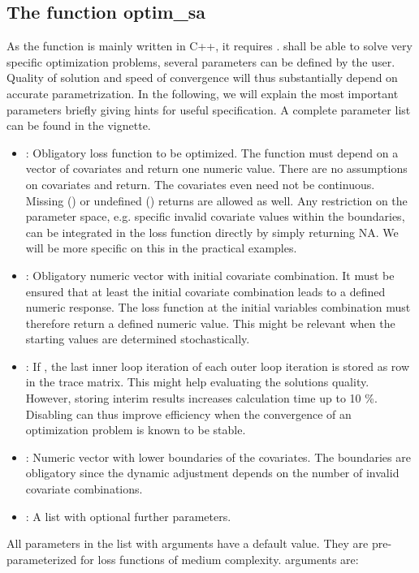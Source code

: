 \subsection{The function optim\_sa}
As the function is mainly written in C++, it requires .  shall be able to solve very specific optimization problems, several parameters can be defined by the user. Quality of solution and speed of convergence will thus substantially depend on accurate parametrization. In the following, we will explain the most important parameters briefly giving hints for useful specification. A complete parameter list can be found in the vignette.
\begin{itemize}
	\item {}: Obligatory loss function to be optimized. The function must depend on a vector of covariates and return one numeric value. There are no assumptions on covariates and return. The covariates even need not be continuous. Missing () or undefined () returns are allowed as well. Any restriction on the parameter space, e.g. specific invalid covariate values within the boundaries, can be integrated in the loss function directly by simply returning NA. We will be more specific on this in the practical examples.
	\item {}: Obligatory numeric vector with initial covariate combination. It must be ensured that at least the initial covariate combination leads to a defined numeric response. The loss function at the initial variables combination must therefore return a defined numeric value. This might be relevant when the starting values are determined stochastically.
	\item {}: If , the last inner loop iteration of each outer loop iteration is stored as row in the trace matrix. This might help evaluating the solutions quality. However, storing interim results increases calculation time up to 10 \%. Disabling  can thus improve efficiency when the convergence of an optimization problem is known to be stable.
	\item {}: Numeric vector with lower boundaries of the covariates. The boundaries are obligatory since the dynamic  adjustment \citep{corana_1987, pronzato_1984} depends on the number of invalid covariate combinations.
	\item {}: A list with optional further parameters.
\end{itemize}
All parameters in the list with  arguments have a default value. They are pre-parameterized for loss functions of medium complexity.  arguments are:

